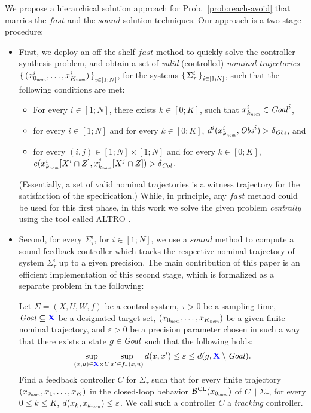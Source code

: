 We propose a hierarchical solution approach for Prob.~\ref{prob:reach-avoid} that marries the $\mathit{fast}$ and the $\mathit{sound}$ solution techniques.
Our approach is a two-stage procedure: 
\begin{itemize}
	\item First, we deploy an off-the-shelf $\mathit{fast}$ method to quickly solve the controller synthesis problem, and obtain a set of  \emph{valid} (controlled) \emph{nominal trajectories} $\set{(x_{0_{\mathit{nom}}}^i,\ldots,x_{K_{\mathit{nom}}}^i)}_{i\in [1;N]}$, for the systems $\set{\Sigma_\tau^i}_{i\in [1;N]}$, such that the following conditions are met:
	\begin{itemize}
		\item For every $i\in [1;N]$, there exists $k\in [0;K]$, such that $x_{k_{\mathit{nom}}}^i\in \mathit{Goal}^i$,
		\item for every $i\in [1;N]$ and for every $k\in [0;K]$, $d^i(x_{k_{\mathit{nom}}}^i,\mathit{Obs}^i) > \delta_{\mathit{Obs}}$, and
		\item for every $(i,j)\in [1;N]\times [1;N]$ and for every $k\in [0;K]$, $e(x_{k_{\mathit{nom}}}^i[X^i\cap Z], x_{k_{\mathit{nom}}}^j[X^j\cap Z]) > \delta_{\mathit{Col}}$. 
	\end{itemize}
	(Essentially, a set of valid nominal trajectories is a witness trajectory for the satisfaction of the specification.)
	While, in principle, any $\mathit{fast}$ method could be used for this first phase, in this work we solve the given problem \emph{centrally} using the tool called ALTRO \cite{howell2019altro}.
	\item Second, for every $\Sigma^i_\tau$, for $i\in [1;N]$, we use a $\mathit{sound}$ method to compute a sound feedback controller which tracks the respective nominal trajectory of system $\Sigma^i_\tau$ up to a given precision.
The main contribution of this paper is an efficient implementation of this second stage, which is formalized as a separate problem in the following:
		\begin{problem}\label{prob:tracking_with_time}
			Let $\Sigma=(X,U,W,f)$ be a control system, $\tau>0$ be a sampling time, $\mathit{Goal}\subseteq {\color{blue} \mathbf{X}}$ be a designated target set, $(x_{0_{\mathit{nom}}},\ldots,x_{K_{\mathit{nom}}})$ be a given finite nominal trajectory, and $\varepsilon>0$ be a precision parameter chosen in such a way that there exists a state $g\in \mathit{Goal}$ such that the following holds:
			\begin{equation}\label{eq:choice of eps}
				\sup_{(x,u)\in {\color{blue} \mathbf{X}}\times U} \sup_{x'\in f_\tau(x,u)} d(x,x')	\leq \varepsilon \leq d(g, {\color{blue} \mathbf{X}}\setminus \mathit{Goal}). 
			\end{equation}
			Find a feedback controller $C$ for $\Sigma_\tau$ such that 
			for every finite trajectory $(x_{0_{\mathit{nom}}},x_1,\ldots,x_K)$ in the closed-loop behavior $\mathcal{B}^{\mathrm{CL}}(x_{0_{\mathit{nom}}})$ of $C \parallel \Sigma_\tau$, for every $0\leq k \leq K$, $d(x_k, x_{k_{\mathit{nom}}}) \leq \varepsilon$.
			We call such a controller $C$ a \emph{tracking} controller.
		\end{problem}
\end{itemize}

